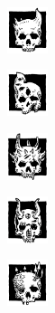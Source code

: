 \begin{multicols}{2}\raggedcolumns

\begin{center}\includegraphics[width=1.2cm]{pics/truechaos.png}\end{center}

%
%

\begin{center}\includegraphics[width=1.2cm]{pics/change.png}\end{center}

%
%

\begin{center}\includegraphics[width=1.2cm]{pics/wrath.png}\end{center}

%
%

\begin{center}\includegraphics[width=1.2cm]{pics/lust.png}\end{center}

%
%

\begin{center}\includegraphics[width=1.2cm]{pics/pestilence.png}\end{center}

%
%

\ifdef{\QRSnote}{\QRSnote}{}

\end{multicols}